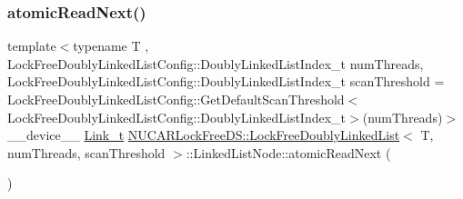 \subsubsection{\texorpdfstring{atomic\+Read\+Next()}{atomicReadNext()}}
{\footnotesize\ttfamily template$<$typename T , Lock\+Free\+Doubly\+Linked\+List\+Config\+::\+Doubly\+Linked\+List\+Index\+\_\+t num\+Threads, Lock\+Free\+Doubly\+Linked\+List\+Config\+::\+Doubly\+Linked\+List\+Index\+\_\+t scan\+Threshold = Lock\+Free\+Doubly\+Linked\+List\+Config\+::\+Get\+Default\+Scan\+Threshold$<$\+Lock\+Free\+Doubly\+Linked\+List\+Config\+::\+Doubly\+Linked\+List\+Index\+\_\+t$>$(num\+Threads)$>$ \\
\+\_\+\+\_\+device\+\_\+\+\_\+ \mbox{\hyperlink{class_n_u_c_a_r_lock_free_d_s_1_1_lock_free_doubly_linked_list_a08f21d5e04bc2a02d6c1d8861a6ba0de}{Link\+\_\+t}} \mbox{\hyperlink{class_n_u_c_a_r_lock_free_d_s_1_1_lock_free_doubly_linked_list}{N\+U\+C\+A\+R\+Lock\+Free\+D\+S\+::\+Lock\+Free\+Doubly\+Linked\+List}}$<$ T, num\+Threads, scan\+Threshold $>$\+::Linked\+List\+Node\+::atomic\+Read\+Next (\begin{DoxyParamCaption}{ }\end{DoxyParamCaption})\hspace{0.3cm}{\ttfamily [inline]}}

\mbox{\label{class_n_u_c_a_r_lock_free_d_s_1_1_lock_free_doubly_linked_list_1_1_linked_list_node_ae5bc375f39c02a40709a9ada2469ca66}} 
